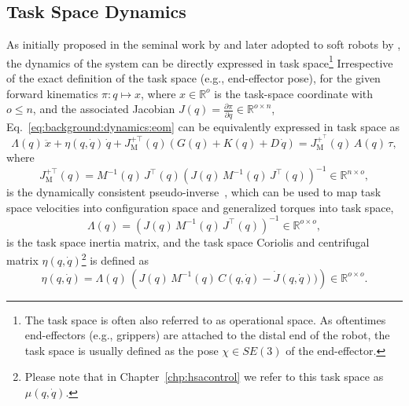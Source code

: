 \subsection{Task Space Dynamics}\label{sub:background:dynamics:task_space}
As initially proposed in the seminal work by \citet{khatib1987unified} and later adopted to soft robots by \citet{della2020model}, the dynamics of the system can be directly expressed in task space\footnote{The task space is often also referred to as operational space. As oftentimes end-effectors (e.g., grippers) are attached to the distal end of the robot, the task space is usually defined as the pose $\chi \in SE(3)$ of the end-effector.}
Irrespective of the exact definition of the task space (e.g., end-effector pose), for the given forward kinematics $\pi: q \mapsto x$, where $x \in \mathbb{R}^o$ is the task-space coordinate with $o \leq n$, and the associated Jacobian $J(q) = \frac{\partial \pi}{\partial q} \in \mathbb{R}^{o \times n}$, Eq.~\ref{eq:background:dynamics:eom} can be equivalently expressed in task space as
\begin{equation}\label{eq:background:dynamics:eom_task_space}
    \Lambda(q) \, \ddot{x} + \eta(q, \dot{q}) \, \dot{q} + J_\mathrm{M}^{+\top}(q) \left ( G(q) + K(q) + D \, \dot{q} \right ) = J_\mathrm{M}^{+^\top}(q) \, A(q) \, \tau,
\end{equation}
where 
\begin{equation}
    J_\mathrm{M}^{+\top}(q) = M^{-1}(q) \, J^\top(q) \left ( J(q) \, M^{-1}(q) \, J^\top(q) \right )^{-1} \in \mathbb{R}^{n \times o},
\end{equation}
is the dynamically consistent pseudo-inverse~\citep{chang1995manipulator}, which can be used to map task space velocities into configuration space and generalized torques into task space,
\begin{equation}
    \Lambda(q) = \left ( J(q) \, M^{-1}(q) \, J^\top(q) \right )^{-1} \in \mathbb{R}^{o \times o},
\end{equation}
is the task space inertia matrix, and the task space Coriolis and centrifugal matrix $\eta(q, \dot{q})$\footnote{Please note that in Chapter~\ref{chp:hsacontrol} we refer to this task space as $\mu(q,\dot{q})$.} is defined as~\citep{khatib1987unified, della2020model}
\begin{equation}
    \eta(q, \dot{q}) = \Lambda(q) \, \left ( J(q) \, M^{-1}(q) \, C(q,\dot{q}) - \dot{J}(q,\dot{q})) \right ) \in \mathbb{R}^{o \times o}.
\end{equation}


